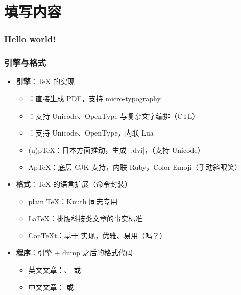 \section{填写内容}

\begin{frame}[fragile]
\frametitle{Hello world!}
\pause
{}
\end{frame}

\begin{frame}[fragile]
\frametitle{引擎与格式}
\begin{itemize}
  \item<+-> \textbf{引擎}：\TeX{} 的实现

    \begin{itemize}
      \item \pdfTeX{}：直接生成 PDF，支持 micro-typography
      \item \XeTeX{}：支持 Unicode、OpenType 与复杂文字编排（CTL）
      \item \LuaTeX{}：支持 Unicode、OpenType，内联 Lua
      \item (u)p\TeX{}：日本方面推动，生成 |.dvi|，（支持 Unicode）
      \item Ap\TeX{}：底层 CJK 支持，内联 Ruby，Color Emoji（手动斜眼笑）
    \end{itemize}

  \item<+-> \textbf{格式}：\TeX{} 的语言扩展（命令封装）

    \begin{itemize}
      \item plain \TeX{}：Knuth 同志专用
      \item \LaTeX{}：排版科技类文章的事实标准
      \item Con\TeX t：基于 \LuaTeX{} 实现，优雅、易用（吗？）
    \end{itemize}

  \item<+-> \textbf{程序}：引擎 + dump 之后的格式代码

    \begin{itemize}
      \item \alert{英文文章：\pdfLaTeX{}、\XeLaTeX{} 或 \LuaLaTeX{}}
      \item \alert{中文文章：\XeLaTeX{} 或 \LuaLaTeX{}}
    \end{itemize}
\end{itemize}
\end{frame}

